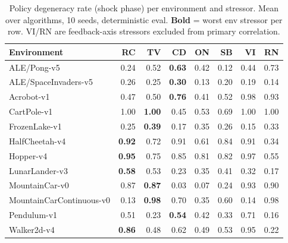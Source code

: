 \begin{table}[t]
\centering
\small
\caption{Policy degeneracy rate (shock phase) per environment and stressor. Mean over algorithms, 10 seeds, deterministic eval. \textbf{Bold} = worst env stressor per row. VI/RN are feedback-axis stressors excluded from primary correlation.}
\label{tab:degeneracy}
\begin{tabular}{lrrrrrrr}
\toprule
Environment & RC & TV & CD & ON & SB & VI & RN \\
\midrule
ALE/Pong-v5 & 0.24 & 0.52 & \textbf{0.63} & 0.42 & 0.12 & 0.44 & 0.73 \\
ALE/SpaceInvaders-v5 & 0.26 & 0.25 & \textbf{0.30} & 0.13 & 0.20 & 0.19 & 0.14 \\
Acrobot-v1 & 0.47 & 0.50 & \textbf{0.76} & 0.41 & 0.52 & 0.98 & 0.93 \\
CartPole-v1 & 1.00 & \textbf{1.00} & 0.45 & 0.53 & 0.69 & 1.00 & 1.00 \\
FrozenLake-v1 & 0.25 & \textbf{0.39} & 0.17 & 0.35 & 0.26 & 0.15 & 0.33 \\
HalfCheetah-v4 & \textbf{0.92} & 0.72 & 0.91 & 0.61 & 0.84 & 0.91 & 0.34 \\
Hopper-v4 & \textbf{0.95} & 0.75 & 0.85 & 0.81 & 0.82 & 0.97 & 0.55 \\
LunarLander-v3 & \textbf{0.58} & 0.53 & 0.23 & 0.35 & 0.41 & 0.32 & 0.17 \\
MountainCar-v0 & 0.87 & \textbf{0.87} & 0.03 & 0.07 & 0.24 & 0.93 & 0.90 \\
MountainCarContinuous-v0 & 0.13 & \textbf{0.98} & 0.70 & 0.35 & 0.60 & 0.14 & 0.98 \\
Pendulum-v1 & 0.51 & 0.23 & \textbf{0.54} & 0.42 & 0.33 & 0.71 & 0.16 \\
Walker2d-v4 & \textbf{0.86} & 0.48 & 0.62 & 0.49 & 0.53 & 0.95 & 0.22 \\
\bottomrule
\end{tabular}
\end{table}